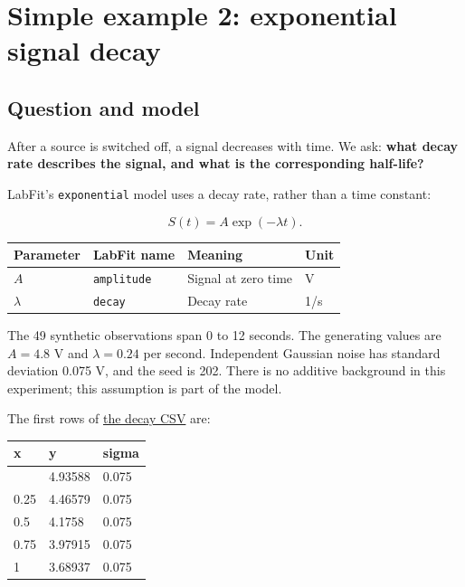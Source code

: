 \documentclass[
  british,
  10pt,
  a4paper,
]{article}
\newcommand{\passthrough}[1]{#1}
\begin{document}
\clearpage

\section{Simple example 2: exponential signal
decay}\label{simple-example-2-exponential-signal-decay}


\subsection{Question and model}\label{question-and-model-1}

After a source is switched off, a signal decreases with time. We ask:
\textbf{what decay rate describes the signal, and what is the
corresponding half-life?}

LabFit's \passthrough{\lstinline!exponential!} model uses a decay rate,
rather than a time constant:

\begin{equation}S(t)=A\exp(-\lambda t).\end{equation}

\begin{longtable}[]{@{}llll@{}}
\toprule\noalign{}
Parameter & LabFit name & Meaning & Unit \\
\midrule\noalign{}
\endhead
\bottomrule\noalign{}
\endlastfoot
\(A\) & \passthrough{\lstinline!amplitude!} & Signal at zero time & V \\
\(\lambda\) & \passthrough{\lstinline!decay!} & Decay rate & 1/s \\
\end{longtable}

The 49 synthetic observations span 0 to 12 seconds. The generating
values are \(A=4.8\) V and \(\lambda=0.24\) per second. Independent
Gaussian noise has standard deviation 0.075 V, and the seed is 202.
There is no additive background in this experiment; this assumption is
part of the model.

The first rows of \href{data/decay.csv}{the decay CSV} are:

\begin{longtable}[]{@{}lll@{}}
\toprule\noalign{}
x & y & sigma \\
\midrule\noalign{}
\endhead
\bottomrule\noalign{}
\endlastfoot
0 & 4.93588 & 0.075 \\
0.25 & 4.46579 & 0.075 \\
0.5 & 4.1758 & 0.075 \\
0.75 & 3.97915 & 0.075 \\
1 & 3.68937 & 0.075 \\
\end{longtable}
\end{document}
